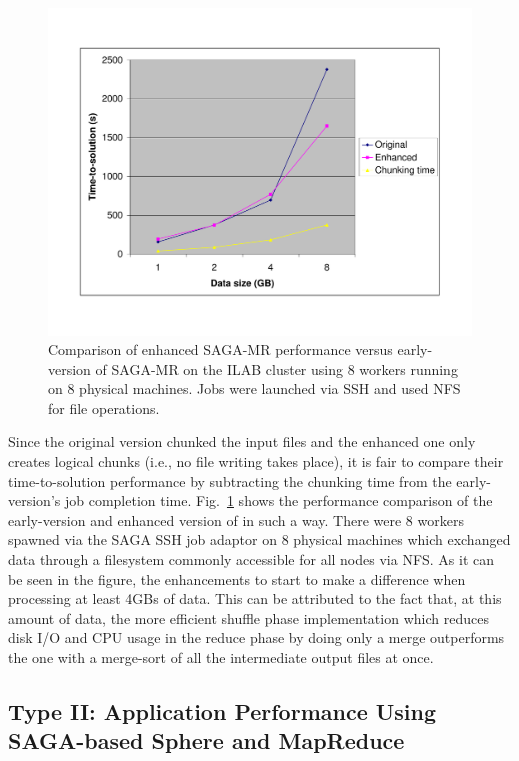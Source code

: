 \documentclass[3p,twocolumn]{elsarticle}
\begin{document}
\begin{figure}[htb!]
 \includegraphics[scale=0.3]{sagamr_original_vs_enhanced.pdf}
 \caption{Comparison of enhanced SAGA-MR performance versus
   early-version of SAGA-MR on the ILAB cluster using 8 workers running on 8
   physical machines. Jobs were launched via SSH and used NFS for file
   operations.}
 \label{sagamr_comparison}
\end{figure}

Since the original \sagamapreduce version chunked the input files and
the enhanced one only creates logical chunks (i.e., no file writing takes
place), it is fair to compare their time-to-solution performance by subtracting
the chunking time from the early-version's job completion time.
Fig.~\ref{sagamr_comparison} shows the performance comparison of the early-version and
enhanced version of \sagamapreduce in such a way.
There were 8 workers spawned via the SAGA SSH job adaptor on 8 physical
machines which exchanged data through a filesystem commonly accessible for all
nodes via NFS. As it can be seen in the figure, the enhancements to \sagamapreduce
start to make a difference when processing at least 4GBs of data.
This can be attributed to the fact that, at this amount of data, the
more efficient shuffle phase implementation which reduces disk I/O and CPU
usage in the reduce phase by doing only a merge outperforms the one with
a merge-sort of all the intermediate output files at once.

\subsection{Type II: Application Performance Using SAGA-based Sphere
  and MapReduce}
\end{document}
